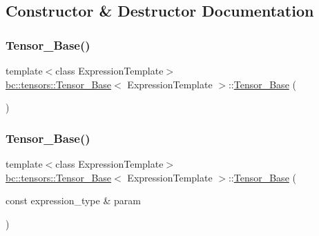 \subsection{Constructor \& Destructor Documentation}
\mbox{\label{classbc_1_1tensors_1_1Tensor__Base_a9074ece5d8b8eb8206facadf8e5c1e70}} 
\subsubsection{\texorpdfstring{Tensor\+\_\+\+Base()}{Tensor\_Base()}\hspace{0.1cm}{\footnotesize\ttfamily [1/7]}}
{\footnotesize\ttfamily template$<$class Expression\+Template$>$ \\
\hyperlink{classbc_1_1tensors_1_1Tensor__Base}{bc\+::tensors\+::\+Tensor\+\_\+\+Base}$<$ Expression\+Template $>$\+::\hyperlink{classbc_1_1tensors_1_1Tensor__Base}{Tensor\+\_\+\+Base} (\begin{DoxyParamCaption}{ }\end{DoxyParamCaption})\hspace{0.3cm}{\ttfamily [inline]}}

\mbox{\label{classbc_1_1tensors_1_1Tensor__Base_aabe1d25d808d5f66eb6b65a73284395b}} 
\subsubsection{\texorpdfstring{Tensor\+\_\+\+Base()}{Tensor\_Base()}\hspace{0.1cm}{\footnotesize\ttfamily [2/7]}}
{\footnotesize\ttfamily template$<$class Expression\+Template$>$ \\
\hyperlink{classbc_1_1tensors_1_1Tensor__Base}{bc\+::tensors\+::\+Tensor\+\_\+\+Base}$<$ Expression\+Template $>$\+::\hyperlink{classbc_1_1tensors_1_1Tensor__Base}{Tensor\+\_\+\+Base} (\begin{DoxyParamCaption}\item[{const expression\+\_\+type \&}]{param }\end{DoxyParamCaption})\hspace{0.3cm}{\ttfamily [inline]}}

